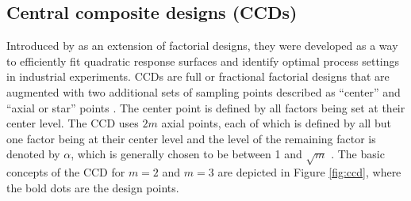 \documentclass [PhD] {package/uclathes}
\begin{document}
\subsection*{Central composite designs (CCDs)}
Introduced by \textcite{box1951series} as an extension of factorial designs, they were developed as a way to efficiently fit quadratic response surfaces and identify optimal process settings in industrial experiments. CCDs are full or fractional factorial designs that are augmented with two additional sets of sampling points described as ``center'' and ``axial or star'' points \parencite{box1951series}. The center point is defined by all factors being set at their center level. The CCD
uses $2m$ axial points, each of which is defined by all but one factor being at their center level and the level of the remaining factor is denoted
by $\alpha$, which is generally chosen to be between 1 and $\sqrt{m}$ \parencite{montgomery2017design}. The basic concepts of the CCD for $m = 2$ and $m = 3$ are depicted in Figure \ref{fig:ccd}, where the bold dots are the design points.
\end{document}
